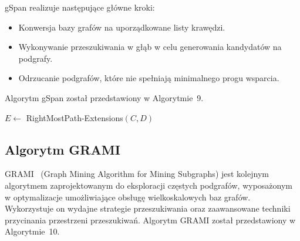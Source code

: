 gSpan realizuje następujące główne kroki:
\begin{itemize}
    \item Konwersja bazy grafów na uporządkowane listy krawędzi.
    \item Wykonywanie przeszukiwania w głąb w celu generowania kandydatów na podgrafy.
    \item Odrzucanie podgrafów, które nie spełniają minimalnego progu wsparcia.
\end{itemize}

Algorytm gSpan został przedstawiony w Algorytmie~9.



\begin{algorithm}[!htb]
\LinesNumbered
{}

\BlankLine

$E \leftarrow$ \textnormal{RightMostPath-Extensions}$(C, D)$ \;


\caption{\textbf{gSpan} algorithm (graph-based Substructure Pattern Mining)}
\label{alg:gspan}
\end{algorithm}




\subsection{Algorytm GRAMI}
GRAMI~\cite{elseidy2014grami} (Graph Mining Algorithm for Mining Subgraphs) jest kolejnym algorytmem zaprojektowanym do eksploracji częstych podgrafów, wyposażonym w optymalizacje umożliwiające obsługę wielkoskalowych baz grafów. Wykorzystuje on wydajne strategie przeszukiwania oraz zaawansowane techniki przycinania przestrzeni przeszukiwań. Algorytm GRAMI został przedstawiony w Algorytmie~10.


